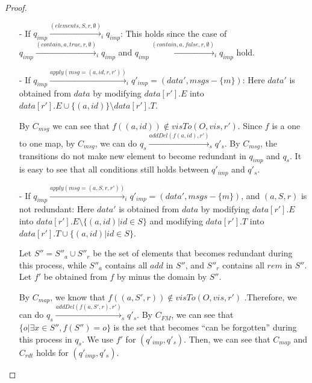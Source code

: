 \begin {proof}
\begin{itemize}
\item[-] If $q_{\mathit{imp}} \xrightarrow{( \mathit{elements},S,r,\emptyset )}_i q_{\mathit{imp}}$: This holds since the case of $q_{\mathit{imp}} \xrightarrow{( \mathit{contain},a,\mathit{true},r,\emptyset )}_i q_{\mathit{imp}}$ and $q_{\mathit{imp}} \xrightarrow{( \mathit{contain},a,\mathit{false},r,\emptyset )}_i q_{\mathit{imp}}$ hold. 

\item[-] If $q_{\mathit{imp}} \xrightarrow{\mathit{apply}( \mathit{msg}=(a,\mathit{id},r,r') )}_i q'_{\mathit{imp}} = (\mathit{data}',\mathit{msgs} - \{ m \})$: Here $\mathit{data}'$ is obtained from $\mathit{data}$ by modifying $\mathit{data}[r'].E$ into $\mathit{data}[r'].E \cup \{ (a,\mathit{id}) \} \setminus \mathit{data}[r'].T$.

    By $C_{\mathit{msg}}$ we can see that $f((a,\mathit{id})) \notin \mathit{visTo}(O,\mathit{vis},r')$. Since $f$ is a one to one map, by $C_{\mathit{msg}}$, we can do $q_s \xrightarrow{\mathit{addDel}( f(a,\mathit{id}),r' )}_s q'_s$. By $C_{\mathit{msg}}$, the transitions do not make new element to become redundant in $q_{\mathit{imp}}$ and $q_s$. It is easy to see that all conditions still holds between $q'_{\mathit{imp}}$ and $q'_s$. 

\item[-] If $q_{\mathit{imp}} \xrightarrow{\mathit{apply}( \mathit{msg}=(a,S,r,r' ))}_i q'_{\mathit{imp}} = (\mathit{data}',\mathit{msgs} - \{ m \})$, and $(a,S,r)$ is not redundant: Here $\mathit{data}'$ is obtained from $\mathit{data}$ by modifying $\mathit{data}[r'].E$ into $\mathit{data}[r'].E \setminus \{ (a,\mathit{id}) \vert \mathit{id} \in S\}$ and modifying $\mathit{data}[r'].T$ into $\mathit{data}[r'].T \cup \{ (a,\mathit{id}) \vert \mathit{id} \in S\}$.

    Let $S'' = S''_a \cup S''_r$ be the set of elements that becomes redundant during this process, while $S''_a$ contains all $\mathit{add}$ in $S''$, and $S''_r$ contains all $\mathit{rem}$ in $S''$. Let $f'$ be obtained from $f$ by minus the domain by $S''$.

    By $C_{\mathit{map}}$, we know that $f((a,S',r)) \notin \mathit{visTo}(O,\mathit{vis},r')$ .Therefore, we can do $q_s \xrightarrow{\mathit{addDel}( f(a,S',r),r' )}_s q'_s$. By $C_{\mathit{FM}}$, we can see that $\{ o \vert \exists x \in S'', f(S'') = o \}$ is the set that becomes ``can be forgotten'' during this process in $q_s$. We use $f'$ for $(q'_{\mathit{imp}},q'_s)$. Then, we can see that $C_{\mathit{map}}$ and $C_{\mathit{rdt}}$ holds for $(q'_{\mathit{imp}},q'_s)$.


\end{itemize}
\end{proof}
